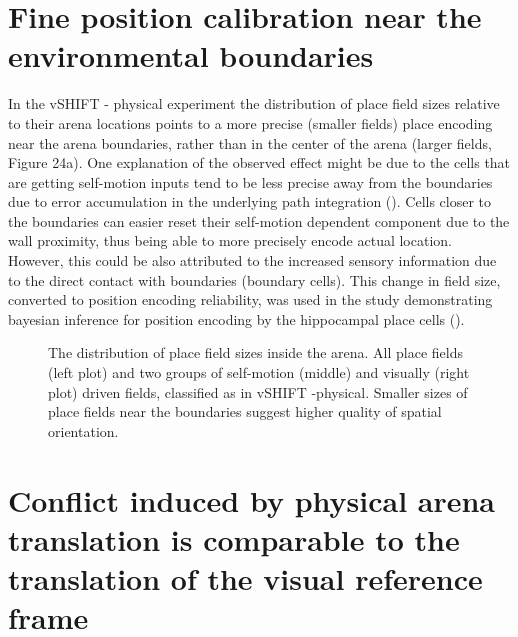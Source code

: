 \section{Fine position calibration near the environmental boundaries}
\label{sec:fine_position_calib}

In the vSHIFT - physical experiment the distribution of place field sizes relative to their arena locations points to a more precise (smaller fields) place encoding near the arena boundaries, rather than in the center of the arena (larger fields, Figure 24a). One explanation of the observed effect might be due to the cells that are getting self-motion inputs tend to be less precise away from the boundaries due to error accumulation in the underlying path integration (\cite{Etienne1996}). Cells closer to the boundaries can easier reset their self-motion dependent component due to the wall proximity, thus being able to more precisely encode actual location. However, this could be also attributed to the increased sensory information due to the direct contact with boundaries (boundary cells). This change in field size, converted to position encoding reliability, was used in the study demonstrating bayesian inference for position encoding by the hippocampal place cells (\cite{Madl2014}).

\begin{figure}
\captionsetup{format=plain}
\caption[Position accuracy based on fields sizes]{
The distribution of place field sizes inside the arena. All place fields (left plot) and two groups of self-motion (middle) and visually (right plot) driven fields, classified as in vSHIFT -physical. Smaller sizes of place fields near the boundaries suggest higher quality of spatial orientation.
}
\label{fig:F24_field_sizes}
\end{figure}


\section{Conflict induced by physical arena translation is comparable to the translation of the visual reference frame}
\label{sec:visual_physical_equal}

